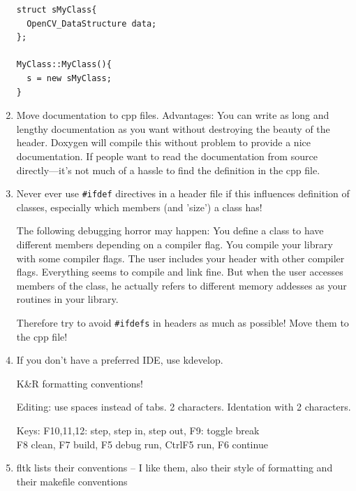 \begin{enumerate}
\begin{code}
\begin{verbatim}
struct sMyClass{
  OpenCV_DataStructure data;
};

MyClass::MyClass(){
  s = new sMyClass;
}
\end{verbatim}
\end{code}

\item Move documentation to cpp files. Advantages: You can write as
  long and lengthy documentation as you want without destroying the
  beauty of the header. Doxygen will compile this without problem to
  provide a nice documentation. If people want to read the
  documentation from source directly---it's not much of a hassle to
  find the definition in the cpp file.


\item Never ever use \verb+#ifdef+ directives in a header file if this
  influences definition of classes, especially which members (and
  'size') a class has!

  The following debugging horror may happen: You define a class to
  have different members depending on a compiler flag. You compile
  your library with some compiler flags. The user includes your header
  with other compiler flags. Everything seems to compile and link
  fine. But when the user accesses members of the class, he actually
  refers to different memory addesses as your routines in your
  library.

  Therefore try to avoid \verb+#ifdefs+ in headers as much as possible! Move
  them to the cpp file!

\item If you don't have a preferred IDE, use kdevelop.

  K\&R formatting conventions!

  Editing: use spaces instead of tabs. 2 characters. Identation with 2
  characters.

  Keys: F10,11,12: step, step in, step out, F9: toggle break\\
  F8 clean, F7 build, F5 debug run, CtrlF5 run, F6 continue


\item fltk lists their conventions -- I like them, also
  their style of formatting and their makefile conventions

\end{enumerate}





